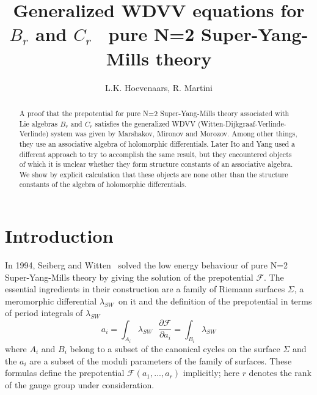\documentclass[a4paper,11pt]{article}
\numberwithin{equation}{section}
\begin{document}
\title{\textbf{Generalized WDVV equations for }$B_{r}$ \textbf{and }$C_{r}$\textbf{%
\ pure N=2 Super-Yang-Mills theory}}
\date{}
\author{L.K. Hoevenaars, R. Martini}
\maketitle

\begin{abstract}
\noindent
A proof that the prepotential for pure N=2 Super-Yang-Mills theory
associated with Lie algebras $B_{r}$ and $C_{r}$ satisfies the generalized
WDVV (Witten-Dijkgraaf-Verlinde-Verlinde) system was given by
Marshakov, Mironov and Morozov. Among other things, they use an
associative algebra of holomorphic differentials.
Later Ito and Yang used a different approach to try to accomplish the
same result, but they encountered objects of which it is unclear whether they
form structure constants of an associative algebra.
We show by explicit calculation that these objects are none other
than the structure constants of the algebra of holomorphic differentials.
\end{abstract}


\section{Introduction}

In 1994, Seiberg and Witten \cite{SEIB-WITT1:1994}\ solved the low energy
behaviour of pure N=2 Super-Yang-Mills theory by giving the solution of the
prepotential $\mathcal{F}$. The essential ingredients in their construction
are a family of Riemann surfaces $\Sigma$, a meromorphic differential
$\lambda_{SW}$\ on it and the definition of the prepotential in terms of
period integrals of $\lambda_{SW}$%
\begin{equation}
a_{i}=\int_{A_{i}}\lambda_{SW}\text{ \ \ \ \ \ \ \ }\frac{\partial\mathcal{F}%
}{\partial a_{i}}=\int_{B_{i}}\lambda_{SW}%
\end{equation}
where $A_{i}$ and $B_{i}$ belong to a subset of the canonical cycles on the
surface $\Sigma$ and the $a_{i}$ are a subset of the moduli parameters of the
family of surfaces. These formulas define the prepotential $\mathcal{F}\left(
a_{1},...,a_{r}\right)  $ implicitly; here $r$ denotes the rank of the gauge
group under consideration.
\end{document}
